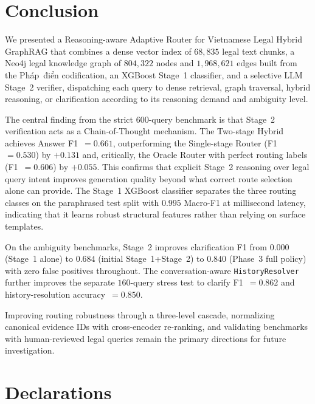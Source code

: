 ﻿\documentclass[11pt,twocolumn]{article}
\begin{document}
\section{Conclusion}
\label{sec:conclusion}

We presented a Reasoning-aware Adaptive Router for Vietnamese Legal
Hybrid GraphRAG that combines a dense vector index of $68{,}835$ legal
text chunks, a Neo4j legal knowledge graph of $804{,}322$ nodes and
$1{,}968{,}621$ edges built from the Pháp~điển codification, an XGBoost
Stage~1 classifier, and a selective LLM Stage~2 verifier, dispatching each
query to dense retrieval, graph traversal, hybrid reasoning, or
clarification according to its reasoning demand and ambiguity level.

The central finding from the strict $600$-query benchmark is that
Stage~2 verification acts as a Chain-of-Thought mechanism. The
Two-stage Hybrid achieves Answer F1~$=0.661$, outperforming the
Single-stage Router (F1~$=0.530$) by $+0.131$ and, critically, the
Oracle Router with perfect routing labels (F1~$=0.606$) by $+0.055$.
This confirms that explicit Stage~2 reasoning over legal query intent
improves generation quality beyond what correct route selection alone
can provide. The Stage~1 XGBoost classifier separates the three routing
classes on the paraphrased test split with $0.995$ Macro-F1 at
millisecond latency, indicating that it learns robust structural features
rather than relying on surface templates.

On the ambiguity benchmarks, Stage~2 improves clarification F1 from
$0.000$ (Stage~1 alone) to $0.684$ (initial Stage~1+Stage~2) to
$0.840$ (Phase~3 full policy) with zero false positives throughout.
The conversation-aware \texttt{HistoryResolver} further improves the
separate $160$-query stress test to clarify F1~$=0.862$ and
history-resolution accuracy~$=0.850$.

Improving routing robustness through a three-level cascade,
normalizing canonical evidence IDs with cross-encoder re-ranking, and
validating benchmarks with human-reviewed legal queries remain the
primary directions for future investigation.

\section*{Declarations}
\end{document}
